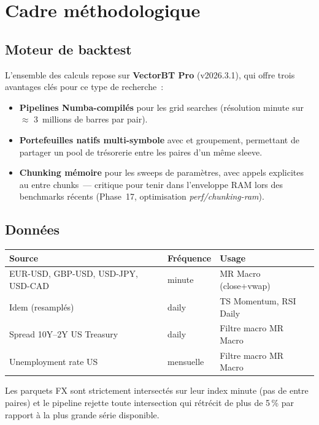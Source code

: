\section{Cadre méthodologique}
\label{sec:methodology}

\subsection{Moteur de backtest}

L'ensemble des calculs repose sur \textbf{VectorBT Pro} (v2026.3.1), qui offre trois avantages clés pour ce type de recherche~:
\begin{itemize}
\item \textbf{Pipelines Numba-compilés} pour les grid searches (résolution minute sur $\approx$ 3~millions de barres par pair).
\item \textbf{Portefeuilles natifs multi-symbole} avec  et groupement, permettant de partager un pool de trésorerie entre les paires d'un même sleeve.
\item \textbf{Chunking mémoire} pour les sweeps de paramètres, avec appels explicites au  entre chunks~--- critique pour tenir dans l'enveloppe RAM lors des benchmarks récents (Phase~17, optimisation \emph{perf/chunking-ram}).
\end{itemize}

\subsection{Données}

\begin{center}
\renewcommand{\arraystretch}{1.15}
\begin{tabular}{lll}
\toprule
\textbf{Source} & \textbf{Fréquence} & \textbf{Usage} \\
\midrule
EUR-USD, GBP-USD, USD-JPY, USD-CAD & minute & MR Macro (close+vwap) \\
Idem (resamplés) & daily & TS Momentum, RSI Daily \\
Spread 10Y--2Y US Treasury & daily & Filtre macro MR Macro \\
Unemployment rate US & mensuelle & Filtre macro MR Macro \\
\bottomrule
\end{tabular}
\end{center}

Les parquets FX sont strictement intersectés sur leur index minute (pas de  entre paires) et le pipeline rejette toute intersection qui rétrécit de plus de 5\,\% par rapport à la plus grande série disponible.

